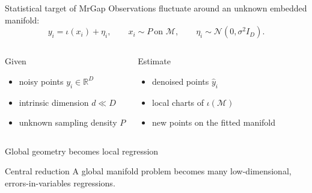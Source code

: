 \documentclass[aspectratio=169,10pt]{beamer}
\newcommand{\M}{\mathcal M}
\newcommand{\R}{\mathbb R}
\begin{document}
\begin{frame}{Statistical target of MrGap}
  Observations fluctuate around an unknown embedded manifold:
  \[
    y_i=\iota(x_i)+\eta_i,\qquad
    x_i\sim P\ \text{on }\M,\qquad
    \eta_i\sim\mathcal N(0,\sigma^2 I_D).
  \]
  \begin{columns}[T]
      \begin{block}{Given}
        \begin{itemize}
          \item noisy points \(y_i\in\R^D\)
          \item intrinsic dimension \(d\ll D\)
          \item unknown sampling density \(P\)
        \end{itemize}
      \end{block}
      \begin{exampleblock}{Estimate}
        \begin{itemize}
          \item denoised points \(\widehat y_i\)
          \item local charts of \(\iota(\M)\)
          \item new points on the fitted manifold
        \end{itemize}
      \end{exampleblock}
  \end{columns}
\end{frame}

\begin{frame}{Global geometry becomes local regression}
  \begin{center}
  \end{center}
  \vspace{0.25cm}
  \begin{alertblock}{Central reduction}
    A global manifold problem becomes many low-dimensional,
    errors-in-variables regressions.
  \end{alertblock}
\end{frame}
\end{document}
